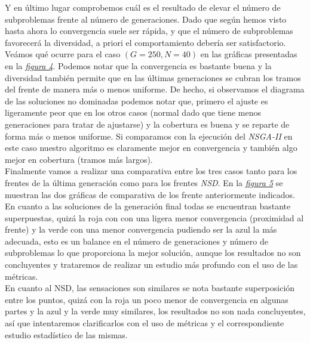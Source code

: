 Y en último lugar comprobemos cuál es el resultado de elevar el número de subproblemas frente al número de generaciones. Dado que según hemos visto hasta ahora lo convergencia suele ser rápida, y que el número de subproblemas favorecerá la diversidad, a priori el comportamiento debería ser satisfactorio. Veámos qué ocurre para el caso $(G=250, N=40)$ en las gráficas presentadas en la \hyperref[fig:4]{\textit{figura 4}}. Podemos notar que la convergencia es bastante buena y la diversidad también permite que en las últimas generaciones se cubran los tramos del frente de manera más o menos uniforme. De hecho, si observamos el diagrama de las soluciones no dominadas podemos notar que, primero el ajuste es ligeramente peor que en los otros casos (normal dado que tiene menos generaciones para tratar de ajustarse) y la cobertura es buena y se reparte de forma más o menos uniforme. Si comparamos con la ejecución del \textit{NSGA-II} en este caso nuestro algoritmo es claramente mejor en convergencia y también algo mejor en cobertura (tramos más largos). \\

Finalmente vamos a realizar una comparativa entre los tres casos tanto para los frentes de la última generación como para los frentes \textit{NSD}. En la \hyperref[fig:5]{\textit{figura 5}} se muestran las dos gráficas de comparativa de los frente anteriormente indicados. En cuanto a las soluciones de la generación final todas se encuentran bastante superpuestas, quizá la roja con con una ligera menor convergencia (proximidad al frente) y la verde con una menor convergencia pudiendo ser la azul la más adecuada, esto es un balance en el número de generaciones y número de subproblemas lo que proporciona la mejor solución, aunque los resultados no son concluyentes y trataremos de realizar un estudio más profundo con el uso de las métricas. \\

En cuanto al NSD, las sensaciones son similares se nota bastante superposición entre los puntos, quizá con la roja un poco menor de convergencia en algunas partes y la azul y la verde muy similares, los resultados no son nada concluyentes, así que intentaremos clarificarlos con el uso de métricas y el correspondiente estudio estadístico de las mismas. 

